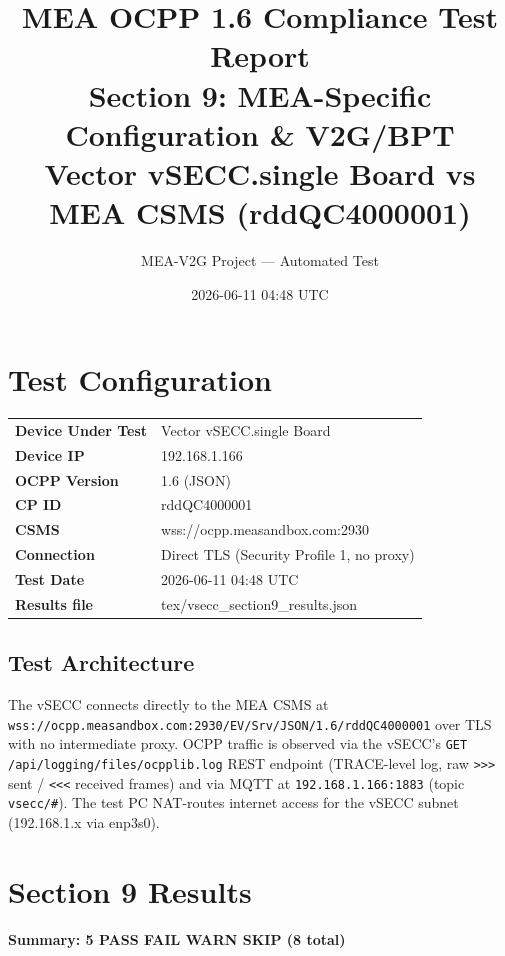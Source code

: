 \documentclass[10pt, a4paper]{article}
\title{\textbf{MEA OCPP 1.6 Compliance Test Report}\\[0.3em]
\large Section 9: MEA-Specific Configuration \& V2G/BPT\\[0.3em]
\normalsize Vector vSECC.single Board vs MEA CSMS (rddQC4000001)}
\author{MEA-V2G Project --- Automated Test}
\date{2026-06-11 04:48 UTC}
\begin{document}
\maketitle
\tableofcontents
\newpage

\section{Test Configuration}
\begin{tabular}{ll}
\textbf{Device Under Test} & Vector vSECC.single Board \\
\textbf{Device IP}         & 192.168.1.166 \\
\textbf{OCPP Version}      & 1.6 (JSON) \\
\textbf{CP ID}             & rddQC4000001 \\
\textbf{CSMS}              & wss://ocpp.measandbox.com:2930 \\
\textbf{Connection}        & Direct TLS (Security Profile 1, no proxy) \\
\textbf{Test Date}         & 2026-06-11 04:48 UTC \\
\textbf{Results file}      & tex/vsecc\_section9\_results.json \\
\end{tabular}

\subsection*{Test Architecture}
The vSECC connects directly to the MEA CSMS at
\texttt{wss://ocpp.measandbox.com:2930/EV/Srv/JSON/1.6/rddQC4000001}
over TLS with no intermediate proxy.
OCPP traffic is observed via the vSECC's \texttt{GET /api/logging/files/ocpplib.log}
REST endpoint (TRACE-level log, raw \texttt{>>>} sent / \texttt{<<<} received frames)
and via MQTT at \texttt{192.168.1.166:1883} (topic \texttt{vsecc/\#}).
The test PC NAT-routes internet access for the vSECC subnet (192.168.1.x via enp3s0).

\section{Section 9 Results}
\textbf{Summary: 5 PASS  FAIL  WARN  SKIP \quad (8 total)}
\end{document}
